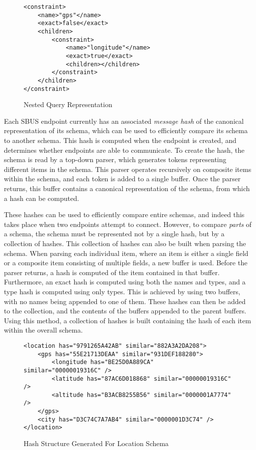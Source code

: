 \documentclass[12pt,twoside,notitlepage]{report}
\begin{document}
\begin{figure}
\begin{lstlisting}[style=xml]
<constraint>
	<name>"gps"</name>
	<exact>false</exact>
	<children>
		<constraint>
			<name>"longitude"</name>
			<exact>true</exact>
			<children></children>
		</constraint>
	</children>
</constraint>
\end{lstlisting}
\caption{Nested Query Representation}
\label{fig:nested_query}
\end{figure} 

Each SBUS endpoint currently has an associated {\sl message hash} of the canonical representation of its schema, which can be used to efficiently compare its schema to another schema. 
This hash is computed when the endpoint is created, and determines whether endpoints are able to communicate. 
To create the hash, the schema is read by a top-down parser, which generates tokens representing different items in the schema. 
This parser operates recursively on composite items within the schema, and each token is added to a single buffer. 
Once the parser returns, this buffer contains a canonical representation of the schema, from which a hash can be computed. 

These hashes can be used to efficiently compare entire schemas, and indeed this takes place when two endpoints attempt to connect. 
However, to compare {\sl parts} of a schema, the schema must be represented not by a single hash, but by a collection of hashes. 
This collection of hashes can also be built when parsing the schema. 
When parsing each individual item, where an item is either a single field or a composite item consisting of multiple fields, a new buffer is used. 
Before the parser returns, a hash is computed of the item contained in that buffer. 
Furthermore, an exact hash is computed using both the names and types, and a type hash is computed using only types. 
This is achieved by using two buffers, with no names being appended to one of them. 
These hashes can then be added to the collection, and the contents of the buffers appended to the parent buffers. 
Using this method, a collection of hashes is built containing the hash of each item within the overall schema. 

\begin{figure}
\begin{lstlisting}[style=xml]
<location has="9791265A42AB" similar="882A3A2DA208">
	<gps has="55E21713DEAA" similar="931DEF188280">
		<longitude has="BE25D0A889CA" similar="00000019316C" />
		<latitude has="87AC6D018868" similar="00000019316C" />
		<altitude has="B3ACB8255B56" similar="0000001A7774" />
	</gps>
	<city has="D3C74C7A7AB4" similar="0000001D3C74" />
</location>
\end{lstlisting}
\caption{Hash Structure Generated For Location Schema}
\label{fig:locationhashes}
\end{figure}
\end{document}
